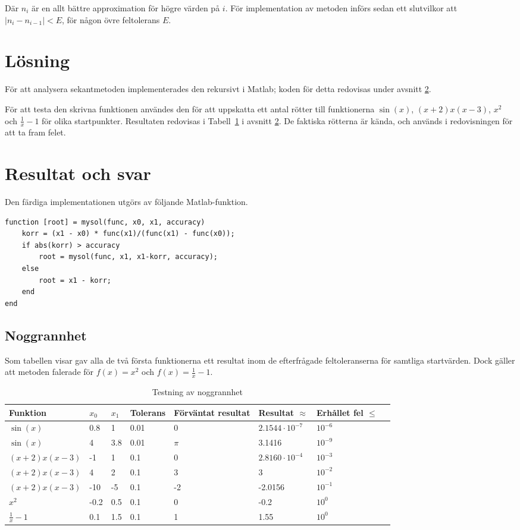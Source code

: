 \documentclass{article}
\begin{document}
Där $n_{i}$ är en allt bättre approximation för högre värden på $i$. För implementation av metoden införs sedan ett slutvilkor att $|n_{i} - n_{i-1}| < E$, för någon övre feltolerans $E$.

\section{Lösning}
För att analysera sekantmetoden implementerades den rekursivt i Matlab; koden för detta redovisas under avsnitt \ref{resultat}. 

För att testa den skrivna funktionen användes den för att uppskatta ett antal rötter till funktionerna $\sin(x)$, $ (x+2) x (x-3)$, $x^2$ och $\frac{1}{x} - 1$ för olika startpunkter. Resultaten redovisas i Tabell~\ref{noggrannhet} i avsnitt \ref{resultat}. De faktiska rötterna är kända, och används i redovisningen för att ta fram felet. 

\section{Resultat och svar} \label{resultat}
Den färdiga implementationen utgörs av följande Matlab-funktion.
\begin{lstlisting}
function [root] = mysol(func, x0, x1, accuracy)
    korr = (x1 - x0) * func(x1)/(func(x1) - func(x0));
    if abs(korr) > accuracy
        root = mysol(func, x1, x1-korr, accuracy);
    else
        root = x1 - korr;
    end
end
\end{lstlisting}

\subsection{Noggrannhet}
Som tabellen visar gav alla de två första funktionerna ett resultat inom de efterfrågade feltoleranserna för samtliga startvärden. Dock gäller att metoden falerade för $f(x) = x^2$ och $f(x)=\frac{1}{x} - 1$.
\begin{table}[H]
  \begin{tabu}{ l l l l X[0.5cm] X l X }
    Funktion & $x_0$ & $x_1$ & Tolerans & Förväntat resultat & Resultat $\approx$ & Erhållet fel $\leq$ \\
    \toprule
    $\sin(x)$ & 0.8 & 1 & 0.01 & 0 & $2.1544 \cdot 10^{-7}$ & $10^{-6}$ \\
    $\sin(x)$ & 4 & 3.8 & 0.01 & $\pi$ & 3.1416 & $10^{-9} $\\
    $ (x+2) x (x-3)$ & -1 & 1 & 0.1 & 0 & $2.8160 \cdot 10^{-4}$ & $10^{-3}$ \\
    $ (x+2) x (x-3)$ & 4 & 2 & 0.1 & 3 & 3 & $10^{-2}$ \\
    $ (x+2) x (x-3)$ & -10 & -5 & 0.1 & -2 & -2.0156 & $10^{-1}$ \\
    $ x^{2}$ & -0.2 & 0.5 & 0.1 & 0 & -0.2  & $10^{0} $ \\
    $ \frac{1}{x} - 1 $ & 0.1 & 1.5 & 0.1 & 1 & 1.55 & $10^{0}$ \\
  \end{tabu}
  \caption{Testning av noggrannhet}\label{noggrannhet}
\end{table}
\end{document}
